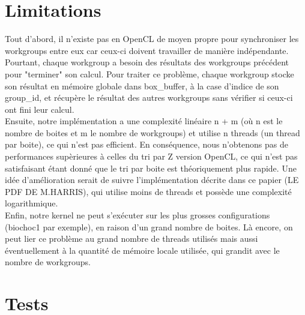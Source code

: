 \documentclass[]{article}
\begin{document}
\section{Limitations}

Tout d'abord, il n'existe pas en OpenCL de moyen propre pour synchroniser les workgroups entre eux car ceux-ci doivent travailler de manière indépendante. Pourtant, chaque workgroup a besoin des résultats des workgroups précédent pour "terminer" son calcul. Pour traiter ce problème, chaque workgroup stocke son résultat en mémoire globale dans box\_buffer, à la case d'indice de son group\_id, et récupère le résultat des autres workgroups sans vérifier si ceux-ci ont fini leur calcul. \\

Ensuite, notre implémentation a une complexité linéaire n + m (où n est le nombre de boites et m le nombre de workgroups) et utilise n threads (un thread par boite), ce qui n'est pas efficient. En conséquence, nous n'obtenons pas de performances supèrieures à celles du tri par Z version OpenCL, ce qui n'est pas satisfaisant étant donné que le tri par boite est théoriquement plus rapide. Une idée d'amélioration serait de suivre l'implémentation décrite dans ce papier (LE PDF DE M.HARRIS), qui utilise moins de threads et possède une complexité logarithmique.\\

Enfin, notre kernel ne peut s'exécuter sur les plus grosses configurations (biochoc1 par exemple), en raison d'un grand nombre de boites. Là encore, on peut lier ce problème au grand nombre de threads utilisés mais aussi éventuellement à la quantité de mémoire locale utilisée, qui grandit avec le nombre de workgroups. 



\section{Tests}
\end{document}

